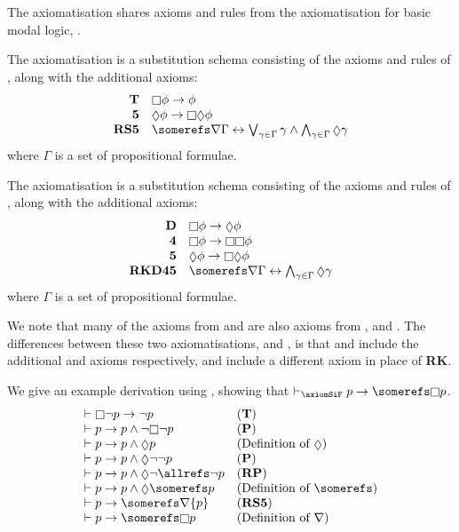 The axiomatisation \axiomKiF{} shares axioms and rules from the axiomatisation
for basic modal logic, \axiomK{}. 

\begin{definition}
The axiomatisation \axiomSiF{} is a substitution schema consisting of the axioms
and rules of \axiomFi{}, along with the additional axioms:
$$
\begin{array}{rl}
{\bf T} & \knows \phi \implies \phi\\
{\bf 5} & \suspects \phi \implies \knows \suspects \phi\\
{\bf RS5} & \somerefs \covers \Gamma \iff \bigvee_{\gamma \in \Gamma} \gamma \land 
\bigwedge_{\gamma \in \Gamma} \suspects \gamma
\end{array}
$$
where $\Gamma$ is a set of propositional formulae.
\end{definition}

\begin{definition}
The axiomatisation \axiomKDiF{} is a substitution schema consisting of the axioms
and rules of \axiomFi{}, along with the additional axioms:
$$
\begin{array}{rl}
{\bf D} & \knows \phi \implies \suspects \phi\\
{\bf 4} & \knows \phi \implies \knows \knows \phi\\
{\bf 5} & \suspects \phi \implies \knows \suspects \phi\\
{\bf RKD45} & \somerefs \covers \Gamma \iff \bigwedge_{\gamma \in \Gamma} \suspects \gamma
\end{array}
$$
where $\Gamma$ is a set of propositional formulae.
\end{definition}

We note that many of the axioms from \axiomSiF{} and \axiomKDiF{} are also
axioms from \axiomS{}, \axiomKD{} and \axiomKiF{}. The differences between
these two axiomatisations, and \axiomKiF{}, is that \axiomSiF{} and \axiomKDiF{}
include the additional \axiomS{} and \axiomKD{} axioms respectively, and include
a different axiom in place of {\bf RK}.

\begin{example}
We give an example derivation using \axiomSiF{}, showing that
$\proves_{\axiomSiF} p \implies \somerefs \knows p$.
$$
\begin{array}{ll}
\proves \knows \neg p \implies \neg p & \text{({\bf T})}\\
\proves p \implies p \land \neg \knows \neg p & \text{({\bf P})}\\
\proves p \implies p \land \suspects p & \text{(Definition of $\suspects$)}\\
\proves p \implies p \land \suspects \neg \neg p & \text{({\bf P})}\\
\proves p \implies p \land \suspects \neg \allrefs \neg p & \text{({\bf RP})}\\
\proves p \implies p \land \suspects \somerefs p & \text{(Definition of $\somerefs$)}\\
\proves p \implies \somerefs \covers \{ p \} & \text{({\bf RS5})}\\
\proves p \implies \somerefs \knows p & \text{(Definition of $\covers$)}
\end{array}
$$
\end{example}

